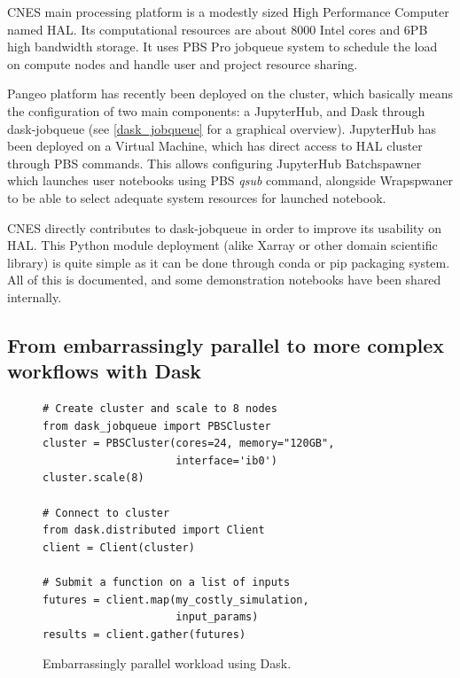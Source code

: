 \documentclass{article}
\begin{document}
CNES main processing platform is a modestly sized High Performance Computer named HAL. Its computational resources are about 8000 Intel cores and 6PB high bandwidth storage. It uses PBS Pro jobqueue system to schedule the load on compute nodes and handle user and project resource sharing.

Pangeo platform has recently been deployed on the cluster, which basically means the configuration of two main components: a JupyterHub, and Dask through dask-jobqueue (see \ref{dask_jobqueue} for a graphical overview). JupyterHub has been deployed on a Virtual Machine, which has direct access to HAL cluster through PBS commands. This allows configuring JupyterHub Batchspawner which launches user notebooks using PBS \textit{qsub} command, alongside Wrapspwaner to be able to select adequate system resources for launched notebook.

CNES directly contributes to dask-jobqueue in order to improve its usability on HAL. This Python module deployment (alike Xarray or other domain scientific library) is quite simple as it can be done through conda or pip packaging system. All of this is documented, and some demonstration notebooks have been shared internally.

\subsection{From embarrassingly parallel to more complex workflows with Dask}
\label{ssec:usecase1}

\begin{figure}
\begin{verbatim}
# Create cluster and scale to 8 nodes
from dask_jobqueue import PBSCluster
cluster = PBSCluster(cores=24, memory="120GB", 
                     interface='ib0')
cluster.scale(8)

# Connect to cluster
from dask.distributed import Client
client = Client(cluster)

# Submit a function on a list of inputs
futures = client.map(my_costly_simulation, 
                     input_params)
results = client.gather(futures)
\end{verbatim}
\caption{\label{ep_dask_code} Embarrassingly parallel workload using Dask.}
\end{figure}
\end{document}
